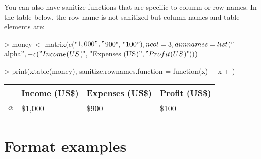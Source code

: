 \documentclass[letterpaper]{article}
\begin{document}
You can also have sanitize functions that are specific to column or row names.  In the table below, the row name is not sanitized but column names and table elements are:
\begin{Schunk}
\begin{Sinput}
> money <- matrix(c("$1,000", "$900", "$100"), ncol = 3, dimnames = list("$\\alpha$", 
+     c("Income (US$)", "Expenses (US$)", "Profit (US$)")))
\end{Sinput}
\end{Schunk}
\begin{Schunk}
\begin{Sinput}
> print(xtable(money), sanitize.rownames.function = function(x) {
+     x
+ })
\end{Sinput}
% latex table generated in R 2.6.0 by xtable 1.5-2 package
% Wed Oct 10 14:26:37 2007
\begin{table}[ht]
\begin{center}
\begin{tabular}{rlll}
  \hline
 & Income (US\$) & Expenses (US\$) & Profit (US\$) \\
  \hline
$\alpha$ & \$1,000 & \$900 & \$100 \\
   \hline
\end{tabular}
\end{center}
\end{table}\end{Schunk}

\section{Format examples}
\end{document}
